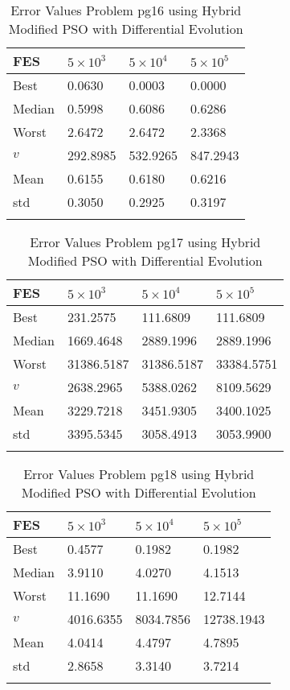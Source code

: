 \documentclass[10pt, a4paper]{book}
\begin{document}
\begin{center}
\begin{longtable}{l l l l}
FES & $5 \times 10^{3}$ & $5 \times 10^{4}$ & $5 \times 10^{5}$ \\
\hline
Best & 0.0630 & 0.0003 & 0.0000 \\
Median & 0.5998 & 0.6086 & 0.6286 \\
Worst & 2.6472 & 2.6472 & 2.3368 \\
$v$ & 292.8985 & 532.9265 & 847.2943 \\
Mean & 0.6155 & 0.6180 & 0.6216 \\
std & 0.3050 & 0.2925 & 0.3197 \\
\caption{ Error Values Problem pg16 using Hybrid Modified PSO with Differential Evolution }
\end{longtable}
\end{center}

\begin{center}
\begin{longtable}{l l l l}
FES & $5 \times 10^{3}$ & $5 \times 10^{4}$ & $5 \times 10^{5}$ \\
\hline
Best & 231.2575 & 111.6809 & 111.6809 \\
Median & 1669.4648 & 2889.1996 & 2889.1996 \\
Worst & 31386.5187 & 31386.5187 & 33384.5751 \\
$v$ & 2638.2965 & 5388.0262 & 8109.5629 \\
Mean & 3229.7218 & 3451.9305 & 3400.1025 \\
std & 3395.5345 & 3058.4913 & 3053.9900 \\
\caption{ Error Values Problem pg17 using Hybrid Modified PSO with Differential Evolution }
\end{longtable}
\end{center}

\begin{center}
\begin{longtable}{l l l l}
FES & $5 \times 10^{3}$ & $5 \times 10^{4}$ & $5 \times 10^{5}$ \\
\hline
Best & 0.4577 & 0.1982 & 0.1982 \\
Median & 3.9110 & 4.0270 & 4.1513 \\
Worst & 11.1690 & 11.1690 & 12.7144 \\
$v$ & 4016.6355 & 8034.7856 & 12738.1943 \\
Mean & 4.0414 & 4.4797 & 4.7895 \\
std & 2.8658 & 3.3140 & 3.7214 \\
\caption{ Error Values Problem pg18 using Hybrid Modified PSO with Differential Evolution }
\end{longtable}
\end{center}
\end{document}

